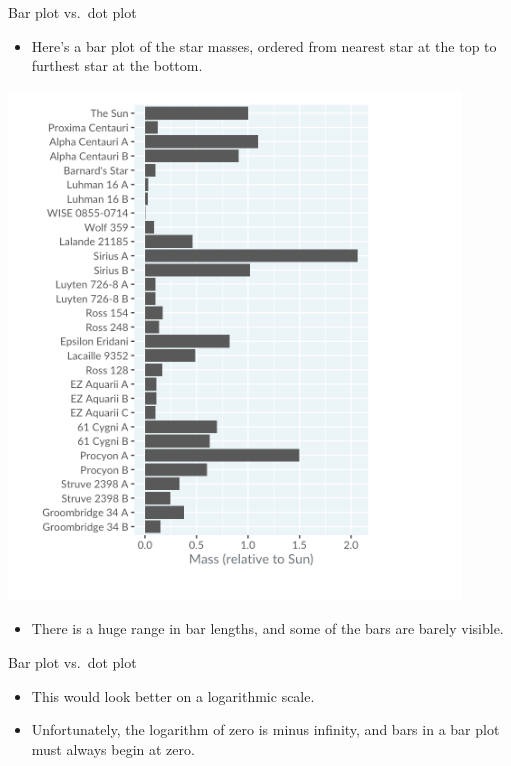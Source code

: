\documentclass[
  ignorenonframetext,
]{beamer}
\providecommand{\tightlist}{%
  \setlength{\itemsep}{0pt}\setlength{\parskip}{0pt}}
\begin{document}
\begin{frame}{Bar plot vs.~dot plot}
\label{bar-plot-vs.-dot-plot}
\begin{itemize}
\tightlist
\item
  Here's a bar plot of the star masses, ordered from nearest star at the
  top to furthest star at the bottom.
\end{itemize}

\includegraphics{../images/im59.png}

\begin{itemize}
\tightlist
\item
  There is a huge range in bar lengths, and some of the bars are barely
  visible.
\end{itemize}
\end{frame}

\begin{frame}{Bar plot vs.~dot plot}
\label{bar-plot-vs.-dot-plot-1}
\begin{itemize}
\item
  This would look better on a logarithmic scale.
\item
  Unfortunately, the logarithm of zero is minus infinity, and bars in a
  bar plot must always begin at zero.
\end{itemize}
\end{frame}
\end{document}

